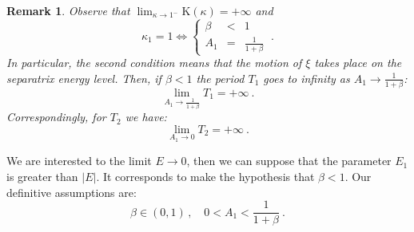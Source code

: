 \documentclass[a4paper]{article}
\newtheorem{remark}{Remark}
\begin{document}
\begin{remark}
  \label{lim-T1T2}
  Observe that $\lim_{\kappa \rightarrow 1^-}{\mathrm{K}}(\kappa)=+\infty$ and 
  \[
  \kappa_1=1 \iff \left\{
  \begin{array}{rcl}
    \beta &<& 1
    \\
    A_1&=&\frac{1}{1+\beta}
  \end{array}
  \right.\ .
  \]
  In particular, the second condition means that the motion of $\xi$ takes 
  place on the separatrix energy level. Then, if $\beta < 1$ 
  the period $T_1$ goes to infinity as $A_1 \rightarrow \frac{1}{1+\beta}$:
  \[
  \lim_{A_1 \rightarrow \frac{1}{1+\beta}}T_1= +\infty\ .
  \]
  Correspondingly, for $T_2$ we have:
  \[
  \lim_{A_1\rightarrow 0}T_2=+\infty \ .
  \]
\end{remark}

We are interested to the limit $E \rightarrow 0$, 
then we can suppose that the  parameter $E_1$ is greater than $|E|$.
It corresponds to make the hypothesis that $\beta<1$.
Our definitive assumptions are:  
\[
\beta \in (0,1)\,,
\quad
0<A_1<\frac{1}{1+\beta}\ .
\] 
\end{document}
